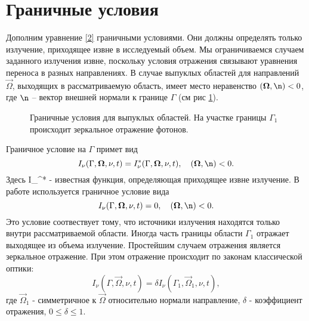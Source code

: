 \section {Граничные условия}
Дополним уравнение \eqref{2} граничными условиями. Они должны определять только излучение, приходящее извне в исследуемый объем. Мы ограничиваемся случаем заданного излучения извне, поскольку условия отражения связывают уравнения переноса в разных направлениях. В случае выпуклых областей для направлений $\vec\Omega$, выходящих в рассматриваемую область, имеет место неравенство $(\vec\Omega, \vec \n) < 0$, где $\vec \n$ -- вектор внешней нормали к границе $\Gamma$ (см рис \ref{fig:6}).
\begin{figure}[ht!]
	\caption{Граничные условия для выпуклых областей. На участке границы $\Gamma_1$ происходит зеркальное отражение фотонов.}
	\label{fig:6}
\end{figure}

Граничное условие на $\Gamma$ примет вид
\begin {equation}
I_\nu (\Gamma, \vec\Omega, \nu, t) = I_\nu^*(\Gamma, \vec\Omega, \nu, t), \quad (\vec\Omega, \vec\n) < 0.
\end {equation}
Здесь I_\nu^* - известная функция, определяющая приходящее извне излучение. В работе используется граничное условие вида
\begin {equation}
I_\nu (\Gamma, \vec\Omega, \nu, t) = 0, \quad (\vec\Omega, \vec\n) < 0.
\end {equation}
Это условие соотвествует тому, что источники излучения находятся только внутри рассматриваемой области.
Иногда часть границы области $\Gamma_1$ отражает выходящее из объема излучение. Простейшим случаем отражения является зеркальное отражение. При этом отражение происходит по законам классической оптики:
\begin {equation}
I_\nu (\Gamma, \vec\Omega, \nu, t) = \delta I_\nu(\Gamma_1, \vec\Omega_1, \nu, t), 
\end {equation}
где $\vec\Omega_1$ - симметричное к $\vec\Omega$ относительно нормали направление, $\delta$ - коэффициент отражения, $0 \leqslant \delta \leqslant 1$.

